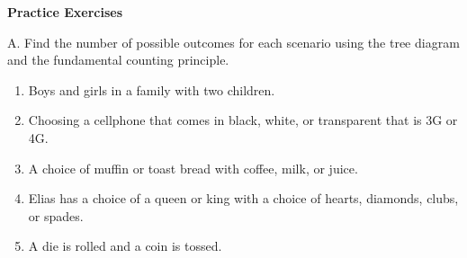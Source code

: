 \textbf{Practice Exercises}

\vspce

A. Find the number of possible outcomes for each scenario using the tree diagram and the fundamental counting principle. 
 
\begin{enumerate}[label = \arabic*. ]
\item Boys and girls in a family with two children.
\item Choosing a cellphone that comes in black, white, or transparent that is 3G or 4G.
\item A choice of muffin or toast bread with coffee, milk, or juice.
\item Elias has a choice of a queen or king with a choice of hearts, diamonds, clubs, or spades. 
\item A die is rolled and a coin is tossed.

\end{enumerate}   
 
 
